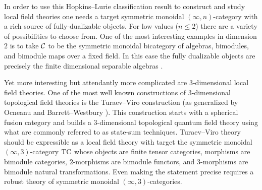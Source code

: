 \documentclass{amsart}
\begin{document}


In order to use this Hopkins--Lurie classification result to construct and study local field theories one needs a target symmetric monoidal $(\infty, n)$-category with a rich source of fully-dualizable objects. For low values ($n\leq 2$) there are a variety of possibilities to choose from. One of the most interesting examples in dimension $2$ is to take $\mathcal C$ to be the symmetric monoidal bicategory of algebras, bimodules, and bimodule maps over a fixed field. In this case the fully dualizable objects are precisely the finite dimensional separable algebras \cite[\S A.3]{schommer-pries-thesis}.

Yet more interesting but attendantly more complicated are 3-dimensional local field theories.  One of the most well known constructions of 3-dimensional topological field theories is the Turaev--Viro \cite{MR1191386, MR1292673} construction (as generalized by Ocneanu \cite{MR1317353} and Barrett--Westbury \cite{MR1686423}). This construction starts with a spherical fusion category and builds a 3-dimensional topological quantum field theory using what are commonly referred to as state-sum techniques.  Turaev--Viro theory should be expressible as a local field theory with target the symmetric monoidal $(\infty,3)$-category $\mathrm{TC}$ whose objects are finite tensor categories, morphisms are bimodule categories, $2$-morphisms are bimodule functors, and $3$-morphisms are bimodule natural transformations.  Even making the statement precise requires a robust theory of symmetric monoidal $(\infty,3)$-categories.  %
\end{document}
